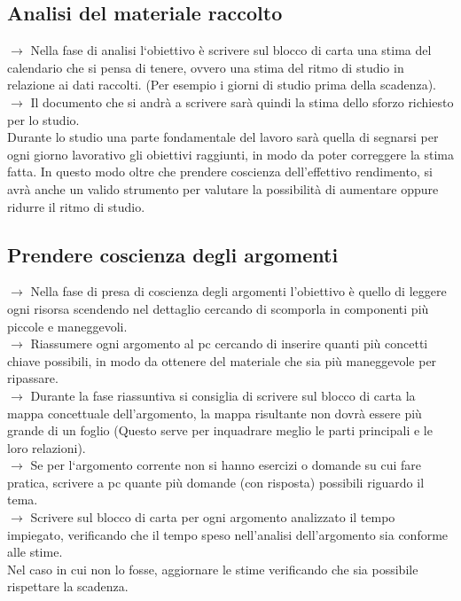 \documentclass[11pt,a4paper]{article}
\begin{document}
\subsection{Analisi del materiale raccolto}
$\rightarrow$ Nella fase di analisi l`obiettivo è scrivere sul blocco di carta una stima del calendario che si pensa di tenere, ovvero una stima del ritmo di studio in relazione ai dati raccolti. (Per esempio i giorni di studio prima della scadenza).\\
$\rightarrow$ Il documento che si andrà a scrivere sarà quindi la stima dello sforzo richiesto per lo studio.\\
 Durante lo studio una parte fondamentale del lavoro sarà quella di segnarsi per ogni giorno lavorativo gli obiettivi raggiunti, in modo da poter correggere la stima fatta. In questo modo oltre che prendere coscienza dell'effettivo rendimento, si avrà anche un valido strumento per valutare la possibilità di aumentare oppure ridurre il ritmo di studio.\\

\subsection{Prendere coscienza degli argomenti}
$\rightarrow$ Nella fase di presa di coscienza degli argomenti l'obiettivo è quello di leggere ogni risorsa scendendo nel dettaglio cercando di scomporla in componenti più piccole e maneggevoli.\\
$\rightarrow$ Riassumere ogni argomento al pc cercando di inserire quanti più concetti chiave possibili, in modo da ottenere del materiale che sia più maneggevole per ripassare.\\
$\rightarrow$ Durante la fase riassuntiva si consiglia di scrivere sul blocco di carta la mappa concettuale dell'argomento, la mappa risultante non dovrà essere più grande di un foglio (Questo serve per inquadrare meglio le parti principali e le loro relazioni).\\
$\rightarrow$ Se per l`argomento corrente non si hanno esercizi o domande su cui fare pratica, scrivere a pc quante più domande (con risposta) possibili riguardo il tema.\\
$\rightarrow$ Scrivere sul blocco di carta per ogni argomento analizzato il tempo impiegato, verificando che il tempo speso nell'analisi dell'argomento sia conforme alle stime.\\
 Nel caso in cui non lo fosse, aggiornare le stime verificando che sia possibile rispettare la scadenza.\\
\end{document}
